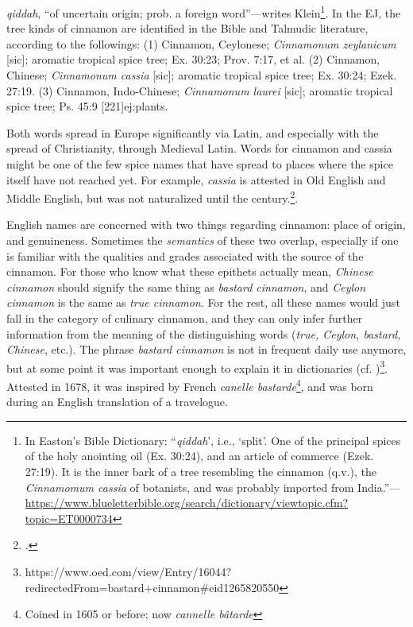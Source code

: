 \textit{qiddah}, ``of uncertain origin; prob. a foreign word''---writes Klein\footnote{In Easton's Bible Dictionary: ``\textit{qiddah}', i.e., `split'. One of the principal spices of the holy anointing oil (Ex. 30:24), and an article of commerce (Ezek. 27:19). It is the inner bark of a tree resembling the cinnamon (q.v.), the \textit{Cinnamomum cassia} of botanists, and was probably imported from India.''---\url{https://www.blueletterbible.org/search/dictionary/viewtopic.cfm?topic=ET0000734}}. 
In the \gls{EJ}, the tree kinds of cinnamon are identified in the Bible and Talmudic literature, according to the followings: (1) Cinnamon, Ceylonese; \textit{Cinnamonum zeylanicum} [sic];  aromatic tropical spice tree; Ex. 30:23; Prov. 7:17, et al. (2) Cinnamon, Chinese; \textit{Cinnamonum cassia} [sic];  aromatic tropical spice tree; Ex. 30:24; Ezek. 27:19. (3) Cinnamon, Indo-Chinese; \textit{Cinnamonum laurei} [sic]; 
aromatic tropical spice tree; Ps. 45:9 [221]{ej:plants}.

Both words spread in Europe significantly via Latin, and especially with the spread of Christianity, through Medieval Latin. Words for cinnamon and cassia \parencite[cf.][38]{musselman_dictionary_2012} might be one of the few spice names that have spread to places where the spice itself have not reached yet. For example, \textit{cassia} is attested in Old English and Middle English, but was not naturalized until the  century.\footcite[cassia]{hoad_concise_2003}.


 

English names are concerned with two things regarding cinnamon: place of origin, and genuineness. Sometimes the \emph{semantics} of these two overlap, especially if one is familiar with the qualities and grades associated with the source of the cinnamon. For those who know what these epithets actually mean, \textit{Chinese cinnamon} should signify the same thing as \textit{bastard cinnamon}, and \textit{Ceylon cinnamon} is the same as \textit{true cinnamon}. For the rest, all these names would just fall in the category of culinary cinnamon, and they can only infer further information from the meaning of the distinguishing words (\textit{true, Ceylon, bastard, Chinese}, etc.). The phrase \textit{bastard cinnamon}  is not in frequent daily use anymore, but at some point it was important enough to explain it in dictionaries (cf. )\footnote{https://www.oed.com/view/Entry/16044?redirectedFrom=bastard+cinnamon\#eid1265820550}. Attested in 1678, it was inspired by French \obs \textit{canelle bastarde}\footnote{Coined in 1605 or before; now \textit{cannelle bâtarde}}, and was born during an English translation of a travelogue. 


